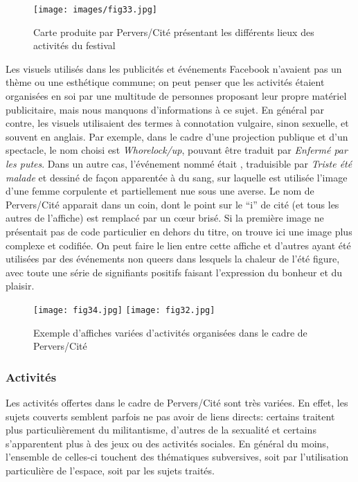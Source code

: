 \begin{figure}[ht]
	\centering
	\texttt{[image: images/fig33.jpg]}
	\caption{Carte produite par Pervers/Cité présentant les différents lieux des activités du festival}\label{fig:carte_perverscite}
\end{figure}

Les visuels utilisés dans les publicités et événements Facebook n'avaient pas un thème ou une esthétique commune; on peut penser que les activités étaient organisées en soi par une multitude de personnes proposant leur propre matériel publicitaire, mais nous manquons d'informations à ce sujet.
En général par contre, les visuels utilisaient des termes à connotation vulgaire, sinon sexuelle, et souvent en anglais.
Par exemple, dans le cadre d'une projection publique et d'un spectacle, le nom choisi est \emph{Whorelock/up}, pouvant être traduit par \emph{Enfermé par les putes}.
Dans un autre cas, l'événement nommé était , traduisible par \emph{Triste été malade} et dessiné de façon apparentée à du sang, sur laquelle est utilisée l'image d'une femme corpulente et partiellement nue sous une averse.
Le nom de Pervers/Cité apparait dans un coin, dont le point sur le \enquote{i} de cité (et tous les autres de l'affiche) est remplacé par un cœur brisé.
Si la première image ne présentait pas de code particulier en dehors du titre, on trouve ici une image plus complexe et codifiée.
On peut faire le lien entre cette affiche et d'autres ayant été utilisées par des événements non queers dans lesquels la chaleur de l'été figure, avec toute une série de signifiants positifs faisant l'expression du bonheur et du plaisir.

\begin{figure}
\centering
{}
{\texttt{[image: fig34.jpg]}}
{\texttt{[image: fig32.jpg]}}
\caption{Exemple d'affiches variées d'activités organisées dans le cadre de Pervers/Cité}\label{figs3132}
\end{figure}

\subsubsection{Activités}
\label{subsec:activitesperverscite}
Les activités offertes dans le cadre de Pervers/Cité sont très variées.
En effet, les sujets couverts semblent parfois ne pas avoir de liens directs: certains traitent plus particulièrement du militantisme, d'autres de la sexualité et certains s'apparentent plus à des jeux ou des activités sociales.
En général du moins, l'ensemble de celles-ci touchent des thématiques subversives, soit par l'utilisation particulière de l'espace, soit par les sujets traités.

